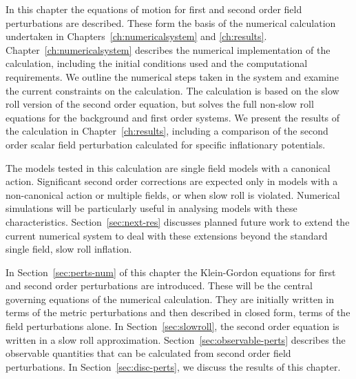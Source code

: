 In this chapter the equations of motion for first and second order field
perturbations are described. These form the basis of the numerical calculation
undertaken in Chapters~\ref{ch:numericalsystem} and \ref{ch:results}.
Chapter~\ref{ch:numericalsystem} describes the numerical implementation of the
calculation, including the initial conditions used and the
computational requirements. We outline the numerical steps
taken in the system and examine the current constraints
on the calculation. The calculation is based on the slow roll version of the second
order equation, but solves the full non-slow roll equations for the
background and first order systems.
% 
We present the results of the calculation
in Chapter~\ref{ch:results}, including a comparison of the second
order scalar field perturbation calculated for specific inflationary potentials. 

%
% 
The models tested in this calculation are single field models with a canonical
action. Significant second order corrections
are expected only in models with a non-canonical action or multiple fields, or
when slow roll is violated. Numerical simulations will be particularly
useful in analysing models with these characteristics.
Section~\ref{sec:next-res} discusses planned future work to extend the current
numerical system to deal with these extensions beyond the standard single field, slow
roll inflation.


In Section~\ref{sec:perts-num} of this chapter the Klein-Gordon equations
for first and second order perturbations are introduced. These will be the central
governing equations of the numerical calculation. They are
initially written in
terms of the metric perturbations and
then described in closed form, \iec terms of the field perturbations
alone. In
Section~\ref{sec:slowroll}, the second order equation is written in a slow roll
approximation.
% 
Section~\ref{sec:observable-perts} describes the observable quantities that can be
calculated from second order field perturbations. In Section~\ref{sec:disc-perts}, we
discuss the results of this chapter.




